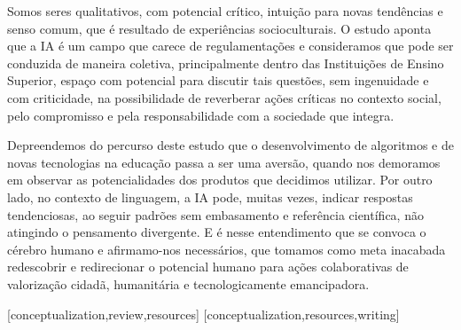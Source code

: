 \documentclass[portuguese]{textolivre}
\begin{document}
Somos seres qualitativos, com potencial crítico, intuição para novas tendências e senso comum, que é resultado de experiências socioculturais. O estudo aponta que a IA é um campo que carece de regulamentações e consideramos que pode ser conduzida de maneira coletiva, principalmente dentro das Instituições de Ensino Superior, espaço com potencial para discutir tais questões, sem ingenuidade e com criticidade, na possibilidade de reverberar ações críticas no contexto social, pelo compromisso e pela responsabilidade com a sociedade que integra.

Depreendemos do percurso deste estudo que o desenvolvimento de algoritmos e de novas tecnologias na educação passa a ser uma aversão, quando nos demoramos em observar as potencialidades dos produtos que decidimos utilizar. Por outro lado, no contexto de linguagem, a IA pode, muitas vezes, indicar respostas tendenciosas, ao seguir padrões sem embasamento e referência científica, não atingindo o pensamento divergente. E é nesse entendimento que se convoca o cérebro humano e afirmamo-nos necessários, que tomamos como meta inacabada redescobrir e redirecionar o potencial humano para ações colaborativas de valorização cidadã, humanitária e tecnologicamente emancipadora. 


\printbibliography\label{sec-bib}


\begin{contributors}
[conceptualization,review,resources]
[conceptualization,resources,writing]
\end{contributors}
\end{document}
